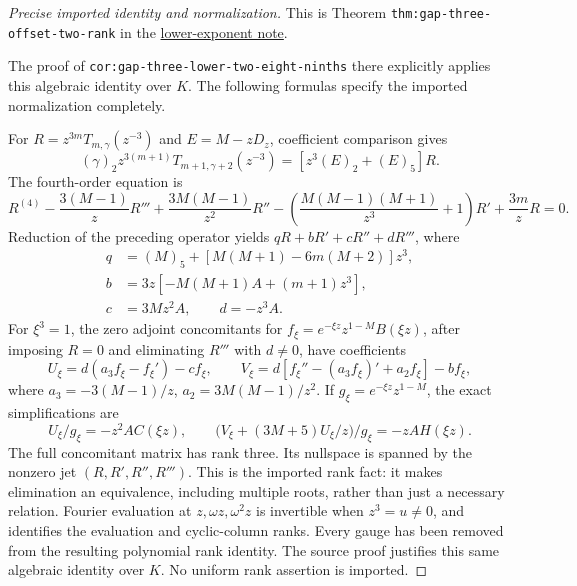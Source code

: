 \documentclass[11pt]{article}
\begin{document}
\begin{proof}[Precise imported identity and normalization]
This is Theorem \texttt{thm:gap-three-offset-}\allowbreak\texttt{two-rank} in the
\href{lower_exponent_initial_and_boundary.tex}{lower-exponent note}.

The proof of
\texttt{cor:gap-three-lower-}\allowbreak\texttt{two-eight-ninths}
there explicitly applies this algebraic identity over $K$.
The following formulas specify the imported normalization completely.

For $R=z^{3m}T_{m,\gamma}(z^{-3})$ and $E=M-zD_z$,
coefficient comparison gives
\[
 (\gamma)_2z^{3(m+1)}T_{m+1,\gamma+2}(z^{-3})
       =[z^3(E)_2+(E)_5]R.
\]
The fourth-order equation is
\[
 R^{(4)}-\frac{3(M-1)}zR'''
 +\frac{3M(M-1)}{z^2}R''
 -\left(\frac{M(M-1)(M+1)}{z^3}+1\right)R'
 +\frac{3m}zR=0.
\]
Reduction of the preceding operator yields $qR+bR'+cR''+dR'''$, where
\[
\begin{aligned}
 q&=(M)_5+[M(M+1)-6m(M+2)]z^3,\\
 b&=3z[-M(M+1)A+(m+1)z^3],\\
 c&=3Mz^2A,\qquad d=-z^3A.
\end{aligned}
\]
For $\xi^3=1$, the zero adjoint concomitants for
$f_\xi=e^{-\xi z}z^{1-M}B(\xi z)$, after imposing $R=0$
and eliminating $R'''$ with $d\ne0$, have coefficients
\[
 U_\xi=d(a_3f_\xi-f_\xi')-cf_\xi,\qquad
 V_\xi=d[f_\xi''-(a_3f_\xi)'+a_2f_\xi]-bf_\xi,
\]
where $a_3=-3(M-1)/z$, $a_2=3M(M-1)/z^2$.
If $g_\xi=e^{-\xi z}z^{1-M}$, the exact simplifications are
\[
 U_\xi/g_\xi=-z^2A C(\xi z),\qquad
 \bigl(V_\xi+(3M+5)U_\xi/z\bigr)/g_\xi=-zA H(\xi z).
\]
The full concomitant matrix has rank three. Its nullspace is spanned
by the nonzero jet $(R,R',R'',R''')$. This is the imported rank fact:
it makes elimination an equivalence, including multiple roots,
rather than just a necessary relation.
Fourier evaluation at $z,\omega z,\omega^2z$ is invertible when
$z^3=u\ne0$, and identifies the evaluation and cyclic-column ranks.
Every gauge has been removed from the resulting polynomial rank identity.
The source proof justifies this same algebraic identity over $K$.
No uniform rank assertion is imported.
\end{proof}
\end{document}
